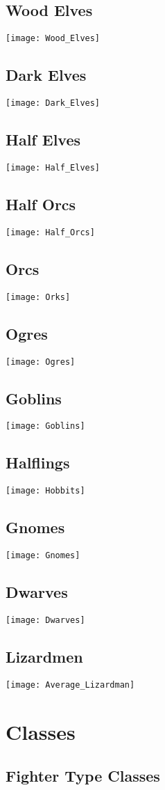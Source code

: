 \documentclass[openany,11pt,a4paper]{book}
\begin{document}
\section{Wood Elves}
\texttt{[image: Wood\_Elves]}
\section{Dark Elves}
\texttt{[image: Dark\_Elves]}
\section{Half Elves}
\texttt{[image: Half\_Elves]}
\section{Half Orcs}
\texttt{[image: Half\_Orcs]}
\section{Orcs}
\texttt{[image: Orks]}
\section{Ogres}
\texttt{[image: Ogres]}
\section{Goblins}
\texttt{[image: Goblins]}
\section{Halflings}
\texttt{[image: Hobbits]}
\section{Gnomes}
\texttt{[image: Gnomes]}
\section{Dwarves}
\texttt{[image: Dwarves]}
\section{Lizardmen}
\texttt{[image: Average\_Lizardman]}
\chapter{Classes}
\section{Fighter Type Classes}
\end{document}
